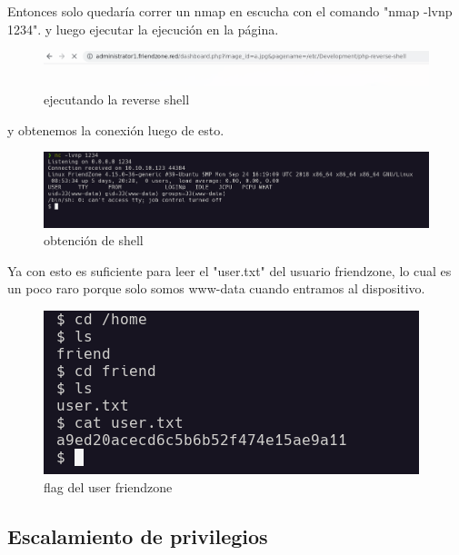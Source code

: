 \documentclass{article}
\begin{document}
Entonces solo quedaría correr un nmap en escucha con el comando "nmap -lvnp 1234".
y luego ejecutar la ejecución en la página.

\begin{figure}[H]
	\center
	\includegraphics[width=\textwidth]{images/friendzone/ejecucion-reverse.png}
	\caption{ejecutando la reverse shell}
\end{figure}

y obtenemos la conexión luego de esto.

\begin{figure}[H]
	\center
	\includegraphics[width=\textwidth]{images/friendzone/shell-obtenida.png}
	\caption{obtención de shell}
\end{figure}

Ya con esto es suficiente para leer el "user.txt" del usuario friendzone, lo cual es un poco raro porque solo somos www-data cuando entramos al dispositivo.

\begin{figure}[H]
	\center
	\includegraphics[width=\textwidth]{images/friendzone/flag-user.png}
	\caption{flag del user friendzone}
\end{figure}


\subsection{Escalamiento de privilegios}

\clearpage 
\end{document}

